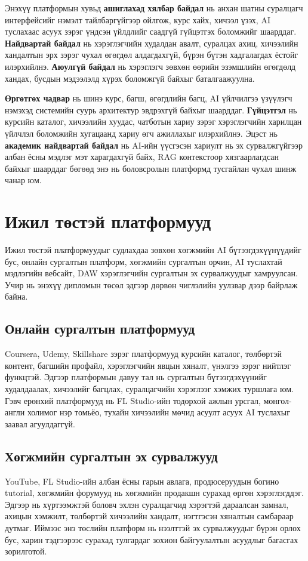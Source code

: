 Энэхүү платформын хувьд \textbf{ашиглахад хялбар байдал} нь анхан шатны суралцагч интерфейсийг нэмэлт тайлбаргүйгээр ойлгож, курс хайх, хичээл үзэх, AI туслахаас асуух зэрэг үндсэн үйлдлийг саадгүй гүйцэтгэх боломжийг шаарддаг. \textbf{Найдвартай байдал} нь хэрэглэгчийн худалдан авалт, суралцах ахиц, хичээлийн хандалтын эрх зэрэг чухал өгөгдөл алдагдахгүй, бүрэн бүтэн хадгалагдах ёстойг илэрхийлнэ. \textbf{Аюулгүй байдал} нь хэрэглэгч зөвхөн өөрийн эзэмшлийн өгөгдөлд хандах, бусдын мэдээлэлд хүрэх боломжгүй байхыг баталгаажуулна.

\textbf{Өргөтгөх чадвар} нь шинэ курс, багш, өгөгдлийн багц, AI үйлчилгээ үзүүлэгч нэмэхэд системийн суурь архитектур эвдрэхгүй байхыг шаарддаг. \textbf{Гүйцэтгэл} нь курсийн каталог, хичээлийн хуудас, чатботын хариу зэрэг хэрэглэгчийн харилцан үйлчлэл боломжийн хугацаанд хариу өгч ажиллахыг илэрхийлнэ. Эцэст нь \textbf{академик найдвартай байдал} нь AI-ийн үүсгэсэн хариулт нь эх сурвалжгүйгээр албан ёсны мэдлэг мэт харагдахгүй байх, RAG контекстоор хязгаарлагдсан байхыг шаарддаг бөгөөд энэ нь боловсролын платформд тусгайлан чухал шинж чанар юм.

\section{Ижил төстэй платформууд}
Ижил төстэй платформуудыг судлахдаа зөвхөн хөгжмийн AI бүтээгдэхүүнүүдийг бус, онлайн сургалтын платформ, хөгжмийн сургалтын орчин, AI туслахтай мэдлэгийн вебсайт, DAW хэрэглэгчийн сургалтын эх сурвалжуудыг хамруулсан. Учир нь энэхүү дипломын төсөл эдгээр дөрвөн чиглэлийн уулзвар дээр байрлаж байна.

\subsection{Онлайн сургалтын платформууд}
Coursera, Udemy, Skillshare зэрэг платформууд курсийн каталог, төлбөртэй контент, багшийн профайл, хэрэглэгчийн явцын хяналт, үнэлгээ зэрэг нийтлэг функцтэй. Эдгээр платформын давуу тал нь сургалтын бүтээгдэхүүнийг худалдаалах, хичээлийг багцлах, суралцагчийн хэрэглээг хэмжих туршлага юм. Гэвч ерөнхий платформууд нь FL Studio-ийн тодорхой ажлын урсгал, монгол-англи холимог нэр томьёо, тухайн хичээлийн мөчид асуулт асуух AI туслахыг заавал агуулдаггүй.

\subsection{Хөгжмийн сургалтын эх сурвалжууд}
YouTube, FL Studio-ийн албан ёсны гарын авлага, продюсеруудын богино tutorial, хөгжмийн форумууд нь хөгжмийн продакшн сурахад өргөн хэрэглэгддэг. Эдгээр нь хүртээмжтэй боловч эхлэн суралцагчид хэрэгтэй дараалсан замнал, ахицын хэмжилт, төлбөртэй хичээлийн хандалт, нэгтгэсэн хяналтын самбараар дутмаг. Иймээс энэ төслийн платформ нь нээлттэй эх сурвалжуудыг бүрэн орлох бус, харин тэдгээрээс сурахад тулгардаг зохион байгуулалтын асуудлыг багасгах зорилготой.

